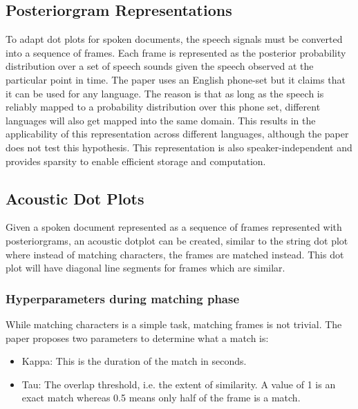 \documentclass[a4paper]{article}
\begin{document}

\subsection{Posteriorgram Representations}
To adapt dot plots for spoken documents, the speech signals must be converted into a sequence of frames. Each frame is represented as the posterior probability distribution over a set of speech sounds given the speech observed at the particular point in time. The paper uses an English phone-set but it claims that it can be used for any language. The reason is that as long as the speech is reliably mapped to a probability distribution over this phone set, different languages will also get mapped into the same domain. This results in the applicability of this representation across different languages, although the paper does not test this hypothesis. This representation is also speaker-independent and provides sparsity to enable efficient storage and computation.

\subsection{Acoustic Dot Plots}
Given a spoken document represented as a sequence of frames represented with posteriorgrams, an acoustic dotplot can be created, similar to the string dot plot where instead of matching characters, the frames are matched instead. This dot plot will have diagonal line segments for frames which are similar.

\subsubsection{Hyperparameters during matching phase}
While matching characters is a simple task, matching frames is not trivial. The paper proposes two parameters to determine what a match is:

\begin{itemize}
\item Kappa: This is the duration of the match in seconds.
\item Tau: The overlap threshold, i.e. the extent of similarity. A value of 1 is an exact match whereas 0.5 means only half of the frame is a match.
\end{itemize}
\end{document}
